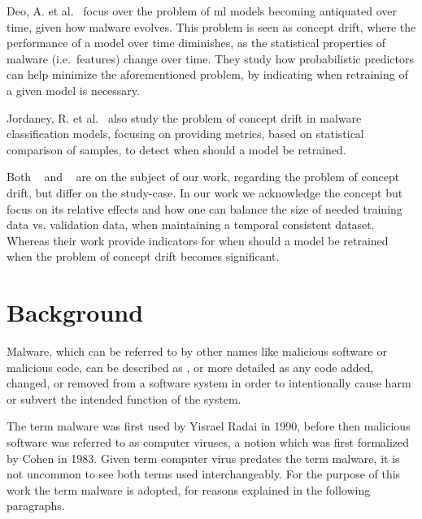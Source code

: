 Deo, A. et al.~\cite{deo2016prescience} focus over the problem of \gls{ml} models becoming antiquated over time, given how malware evolves. This problem is seen as concept drift, where the performance of a model over time diminishes, as the statistical properties of malware (i.e.\ features) change over time. They study how probabilistic predictors can help minimize the aforementioned problem, by indicating when retraining of a given model is necessary. 

Jordaney, R. et al.~\cite{jordaney2017transcend} also study the problem of concept drift in malware classification models, focusing on providing metrics, based on statistical comparison of samples, to detect when should a model be retrained. 

Both ~\cite{deo2016prescience} and ~\cite{jordaney2017transcend} are on the subject of our work, regarding the problem of concept drift, but differ on the study-case. In our work we acknowledge the concept but focus on its relative effects and how one can balance the size of needed training data vs. validation data, when maintaining a temporal consistent dataset. Whereas their work provide indicators for when should a model be retrained when the problem of concept drift becomes significant.

\newpage
{}

\section{Background}
\label{section:background}

Malware, which can be referred to by other names like malicious software or malicious code, can be described as \cite{christodorescu:semantics}, or more detailed as any code added, changed, or removed from a software system in order to intentionally cause harm or subvert the intended function of the system\cite{mcgraw:mal_code}.

The term malware was first used by Yisrael Radai in 1990\cite{elisan:malware}, before then malicious software was referred to as computer viruses, a notion which was first formalized by Cohen in 1983\cite{cohen:virus}. Given term computer virus predates the term malware, it is not uncommon to see both terms used interchangeably. For the purpose of this work the term malware is adopted, for reasons explained in the following paragraphs.

